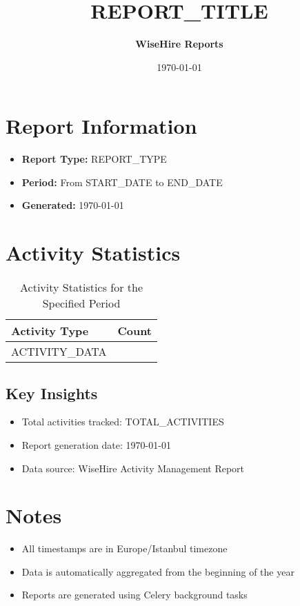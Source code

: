 \documentclass{article}
\title{\textcolor{primarycolor}{REPORT_TITLE}}
\author{\textbf{WiseHire Reports}}
\date{\today}
\begin{document}
\maketitle

\section{Report Information}
\begin{itemize}
    \item \textbf{Report Type:} REPORT_TYPE
    \item \textbf{Period:} From START_DATE to END_DATE
    \item \textbf{Generated:} \today
\end{itemize}

\section{Activity Statistics}
\begin{table}[h!]
\centering
\begin{tabular}{|l|c|}
\hline
\rowcolor{primarycolor!20}
\textbf{Activity Type} & \textbf{Count} \\
\hline
ACTIVITY_DATA
\end{tabular}
\caption{Activity Statistics for the Specified Period}
\label{tab:activity_stats}
\end{table}


\subsection{Key Insights}
\begin{itemize}
    \item Total activities tracked: TOTAL_ACTIVITIES
    \item Report generation date: \today
    \item Data source: WiseHire Activity Management Report
\end{itemize}

\section{Notes}
\begin{itemize}
    \item All timestamps are in Europe/Istanbul timezone
    \item Data is automatically aggregated from the beginning of the year
    \item Reports are generated using Celery background tasks
\end{itemize}
\end{document}
